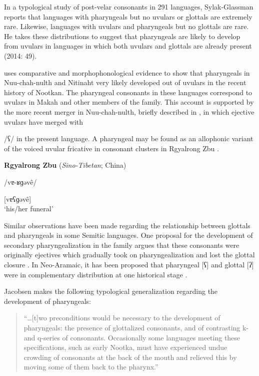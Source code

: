   In a typological study of post-velar consonants in 291 languages, Sylak-Glassman reports that languages with pharyngeals but no uvulars or glottals are extremely rare. Likewise, languages with uvulars and pharyngeals but no glottals are rare. He takes these distributions to suggest that pharyngeals are likely to develop from uvulars in languages in which both uvulars and glottals are already present (2014: 49).

  \citet{Jacobsen1969} uses comparative and morphophonological evidence to show that pharyngeals in Nuu-chah-nulth and Nitinaht very likely developed out of uvulars in the recent history of Nootkan. The pharyngeal consonants in these languages correspond to uvulars in Makah and other members of the family. This account is supported by the more recent merger in Nuu-chah-nulth, briefly described in , in which ejective uvulars have merged with 

/ʕ/ in the present language. A pharyngeal may be found as an allophonic variant of the voiced uvular fricative in consonant clusters in Rgyalrong Zbu .

\ea\label{ex:4.47}
  \textbf{Rgyalrong Zbu} (\textit{Sino-Tibetan}; China)

/vɐ-ʁɡəvê/

[vɐʕɡəvê]\\
\glt ‘his/her funeral’
\citep[62]{Gong2018}
\z

  Similar observations have been made regarding the relationship between glottals and pharyngeals in some Semitic languages. One proposal for the development of secondary pharyngealization in the family argues that these consonants were originally ejectives which gradually took on pharyngealization and lost the glottal closure \citep{Zemánek1996}. In Neo-Aramaic, it has been proposed that pharyngeal [ʕ] and glottal [ʔ] were in complementary distribution at one historical stage \citep{Hoberman1985}.

  Jacobsen makes the following typological generalization regarding the development of pharyngeals:

\begin{quote}
“…[t]wo preconditions would be necessary to the development of pharyngeals: the presence of glottalized consonants, and of contrasting k- and q-series of consonants. Occasionally some languages meeting these specifications, such as early Nootka, must have experienced undue crowding of consonants at the back of the mouth and relieved this by moving some of them back to the pharynx.” 
\citep[152]{Jacobsen1969}
\end{quote}

